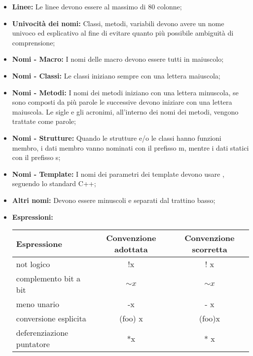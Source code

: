 \documentclass[../NomeDocumento.tex]{subfiles}
\begin{document}
	\begin{itemize}
		
		\item \textbf{Linee:} Le linee devono essere al massimo di 80 colonne;
		
		\item \textbf{Univocità dei nomi:} Classi, metodi, variabili devono avere un
		nome univoco ed esplicativo al fine di evitare quanto più possibile ambiguità di comprensione;
		
		\item \textbf{Nomi - Macro:} I nomi delle macro devono essere tutti in maiuscolo;
		
		\item \textbf{Nomi - Classi:} Le classi iniziano sempre con una lettera maiuscola;
		
		\item \textbf{Nomi - Metodi:} I nomi dei metodi iniziano con una lettera minuscola,
		se sono composti da più parole le successive devono iniziare con una lettera maiuscola. Le sigle e gli acronimi, all'interno dei nomi dei metodi, vengono trattate come parole;
		
		\item \textbf{Nomi - Strutture:} Quando le strutture e/o le classi hanno funzioni membro, i dati membro vanno nominati con il prefisso m\textunderscore , mentre i dati statici con il prefisso s\textunderscore;
		
		\item \textbf{Nomi - Template:} I nomi dei parametri dei template devono usare , seguendo lo standard C++;
		
		\item \textbf{Altri nomi:} Devono essere minuscoli e separati dal trattino basso;
		
		\item \textbf{Espressioni:}
		\begin{center}
		\begin{tabular}{|l|c|c|}
			\hline
			Espressione&Convenzione adottata&Convenzione scorretta \\ \hline
			not logico&!x&! x \\ \hline
			complemento bit a bit&${\sim}x$&$\sim x$ \\ \hline
			meno unario&-x&- x \\ \hline
			conversione esplicita&(foo) x&(foo)x \\ \hline
			deferenziazione puntatore&*x&* x \\ \hline
		\end{tabular}
		\end{center}
		

\end{itemize}
\end{document}
